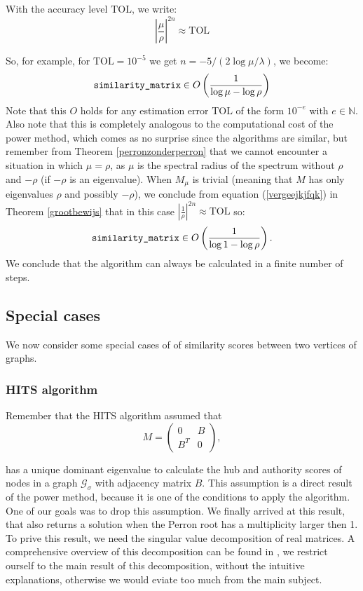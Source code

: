 \documentclass[a4paper,11pt]{report}
\newcommand{\N}{{\mathbb N}}
\newcommand{\graf}{\mathscr{G}}
\newcommand{\tol}{\text{TOL}}
\begin{document}
With the accuracy level $\tol$, we write:
$$\left|\frac{\mu}{\rho} \right|^{2n} \approx \tol$$

So, for example, for $\tol = 10^{-5}$ we get $n = -5/(2\log{\mu/\lambda})$, we become:
$$\text{\texttt{similarity\_matrix}} \in O\left(\frac{1}{\log{\mu- \log\rho}}\right)$$
Note that this $O$ holds for any estimation error $\tol$ of the form $10^{-e}$ with $e \in \N$. 
Also note that this is completely analogous to the computational cost of the 
power method, which comes as no surprise since the algorithms are similar, but remember 
from Theorem \ref{perronzonderperron} that we cannot encounter a situation in 
which $\mu = \rho$, as $\mu$ is the spectral radius
of the spectrum without $\rho$ and $-\rho$ (if $-\rho$ is an eigenvalue). When $M_\mu$ 
is trivial (meaning that $M$ has only eigenvalues $\rho$ and possibly $-\rho$), we conclude from 
equation
(\ref{vergeejkjfqk}) in Theorem \ref{grootbewijs} that in this case $\left|\frac{1}{\rho} \right|^{2n} \approx \tol$ so:
$$\text{\texttt{similarity\_matrix}} \in O\left(\frac{1}{\log{1- \log\rho}}\right).$$
We conclude that the algorithm can always be calculated in a finite number of steps.
\subsection{Special cases}\label{specialcases}
We now consider some special cases of of similarity scores between two vertices 
of graphs.
\subsubsection{HITS algorithm}
Remember that the HITS algorithm assumed that
$$M =  \begin{pmatrix} 
0 & B\\
B^T & 0
\end{pmatrix},$$ 

has a unique dominant eigenvalue to 
calculate the hub and authority scores of nodes in a graph $\graf_\sigma$ with adjacency matrix
$B$. This assumption is a direct result of the power method, because it is one 
of the conditions to apply the algorithm. One of our goals was to drop this 
assumption. We finally arrived at 
this result, that also returns a solution when the Perron root has a 
multiplicity larger then 1. To prive this result, we need the singular value 
decomposition of real matrices. A comprehensive overview of this decomposition 
can be found in \cite{tomasi}, we restrict ourself to the main result of this 
decomposition, without the intuitive explanations, otherwise we would eviate too 
much from the main subject.
\end{document}
